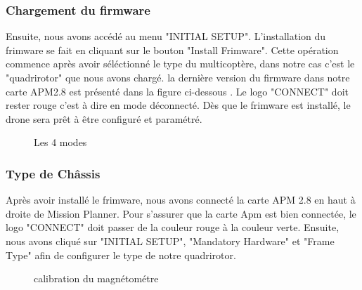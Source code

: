 	\subsubsection{Chargement du firmware }
	Ensuite, nous avons accédé au menu "INITIAL SETUP". L'installation du frimware se fait en cliquant sur le bouton "Install Frimware". Cette opération commence après avoir séléctionné le type du multicoptère, dans notre cas c'est le "quadrirotor" que nous avons chargé.  la dernière version du firmware dans
	notre carte APM2.8 est présenté dans la figure ci-dessous . Le logo "CONNECT" doit rester rouge c'est à dire en mode déconnecté. Dès que le frimware est installé, le drone sera prêt à être configuré et paramétré.
	\begin{figure}[h]
		\begin{center}
			\centering
		\end{center}
		\caption{Les 4 modes}
	\end{figure}
	
	\subsubsection{Type de Châssis}
	Après avoir installé le frimware, nous avons connecté  la carte APM 2.8 en haut à droite de Mission Planner. Pour s'assurer que la carte Apm est bien connectée, le logo "CONNECT" doit passer de la couleur rouge à la couleur verte. Ensuite, nous avons cliqué sur "INITIAL SETUP", "Mandatory Hardware" et "Frame Type" afin de  configurer le type de notre quadrirotor. 
	\begin{figure}[h]
		\begin{center}
			\centering
		\end{center}
		\caption{calibration du magnétométre}
	\end{figure}
